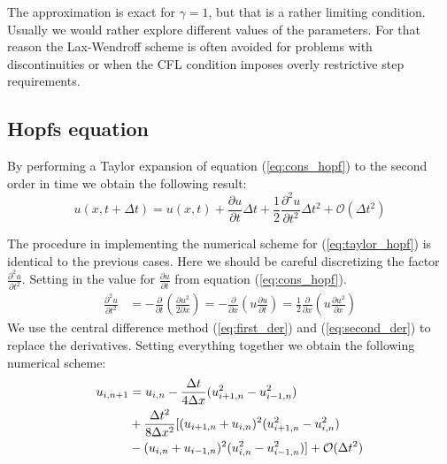 \documentclass[5p,sort&compress]{elsarticle}
\numberwithin{equation}{subsection}
\begin{document}
The approximation is exact for $\gamma = 1$, but that is a rather limiting condition. Usually we would rather explore different values of the parameters. For that reason the Lax-Wendroff scheme is often avoided for problems with discontinuities or when the CFL condition imposes overly restrictive step requirements.

\subsection{Hopfs equation}
By performing a Taylor expansion of equation (\ref{eq:cons_hopf}) to the second order in time we obtain the following result:
\begin{equation}
    u(x,t+\Delta t) = u(x,t) + \frac{\partial u}{\partial t} \Delta t + \frac{1}{2}\frac{\partial^2 u}{\partial t^2}\Delta t^2 + \mathcal{O}(\Delta t^2)
    \label{eq:taylor_hopf}
\end{equation}

 The procedure in implementing the numerical scheme for (\ref{eq:taylor_hopf}) is identical to the previous cases. Here we should be careful discretizing the factor $\frac{\partial^2 u}{\partial t^2}$. Setting in the value for $\frac{\partial u}{\partial t}$ from equation (\ref{eq:cons_hopf}).
\begin{align*}
    \frac{\partial^2 u}{\partial t^2} &= - \frac{\partial}{\partial t}\left( \frac{\partial u^2}{2\partial x} \right) = -\frac{\partial}{\partial x}\left( u \frac{\partial u}{\partial t} \right) = \frac{1}{2}\frac{\partial}{\partial x}\left( u \frac{\partial u^2}{\partial x} \right)
\end{align*}
We use the central difference method (\ref{eq:first_der}) and (\ref{eq:second_der}) to replace the derivatives. Setting everything together we obtain the following numerical scheme:
\begin{align}
    u_{i,n+1} &= u_{i,n} - \frac{\Delta t}{4\Delta x} (u_{i+1,n}^2 - u_{i-1,n}^2) \label{eq:hopf_discrete}\notag\\
 &+ \frac{\Delta t^2}{8\Delta x^2} [ (u_{i+1,n} + u_{i,n})^2 (u_{i+1,n}^2 - u_{i,n}^2) \\ \notag
&-(u_{i,n} + u_{i-1,n})^2 (u_{i,n}^2 - u_{i-1,n}^2) ] + \mathcal{O}(\Delta t^2)
\end{align}
\end{document}
